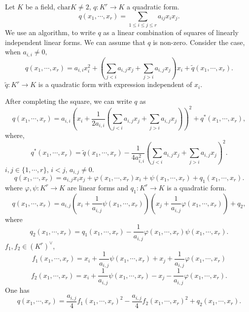 \begin{remark}
    Let $K$ be a field, $\mathrm{char} K \neq 2$, $q: K^r \rightarrow K$ a quadratic form.
    $$ q(x_1,\cdots,x_r) = \sum_{1\le i \le j\le r} a_{ij} x_i x_j. $$
    We use an algorithm, to write $q$ as a linear combination of squares of linearly independent linear forms. We can assume that $q$ is non-zero.
    Consider the case, when $a_{i,i}\neq 0,$
    $$ q(x_1,\cdots,x_r) = a_{i,i} x_i^2 +\left(\sum_{j<i} a_{i,j} x_j + \sum_{j>i} a_{i,j} x_j\right)x_i + \tilde{q}\left(x_1,\cdots,x_r\right).$$
    $\tilde{q}:K^{r}\rightarrow K$ is a quadratic form with expression independent of $x_i$.

    \quad After completing the square, we can write $q$ as
    $$ q(x_1,\cdots,x_r) = a_{i,i} \left(x_i + \frac{1}{2 a_{i,i}} \left(\sum_{j<i} a_{i,j} x_j + \sum_{j>i} a_{i,j} x_j\right)\right)^2 + q^*\left(x_1,\cdots,x_r\right),$$
    where,
    $$ q^* \left(x_1,\cdots,x_r\right)=\tilde{q}\left(x_1,\cdots,x_r\right) - \frac{1}{4 a_{i,i}^2} \left(\sum_{j<i} a_{i,j} x_j + \sum_{j>i} a_{i,j} x_j\right)^2.$$
    $i,j\in\{1,\cdots,r\}$, $i<j$, $a_{i,j}\neq 0$.
    $$ q(x_1,\cdots,x_r) = a_{i,j} x_i x_j + \varphi(x_1,\cdots,x_r)x_i + \psi(x_1,\cdots,x_r) + q_1(x_1,\cdots,x_r).$$
    where $\varphi, \psi : K^r \rightarrow K$ are linear forms and $q_1: K^r\rightarrow K$ is a quadratic form.
    $$ q(x_1,\cdots,x_r) = a_{i,j} \left(x_i + \frac{1}{a_{i,j}} \psi(x_1,\cdots,x_r)\right) \left(x_j + \frac{1}{a_{i,j}} \varphi(x_1,\cdots,x_r)\right) + q_2,$$
    where
    $$ q_2(x_1,\cdots,x_r) = q_1(x_1,\cdots,x_r) - \frac{1}{a_{i,j}} \varphi(x_1,\cdots,x_r) \psi(x_1,\cdots,x_r).$$
    $f_1,f_2\in \left(K^r\right)^\vee$,
    $$ f_1(x_1,\cdots,x_r) = x_i + \frac{1}{a_{i,j}} \psi(x_1,\cdots,x_r) + x_j + \frac{1}{a_{i,j}}\varphi(x_1,\cdots,x_r)$$
    $$ f_2(x_1,\cdots,x_r) = x_i + \frac{1}{a_{i,j}} \psi(x_1,\cdots,x_r) - x_j - \frac{1}{a_{i,j}}\varphi(x_1,\cdots,x_r).$$
    One has
    $$ q(x_1,\cdots,x_r) = \frac{a_{i,j}}{4} f_1(x_1,\cdots,x_r)^2 - \frac{a_{i,j}}{4} f_2(x_1,\cdots,x_r)^2 + q_2(x_1,\cdots,x_r).$$
\end{remark}

